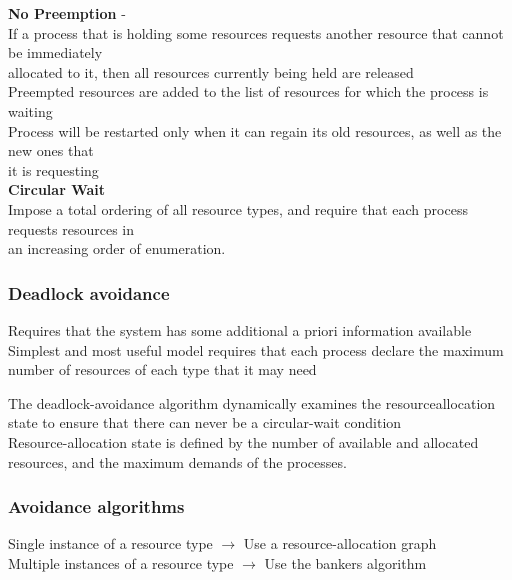 \documentclass[a4paper,10pt,titlepage]{report}
\begin{document}
\textbf{No Preemption} - \\
\hspace{10mm}If a process that is holding some resources requests another resource that
cannot be immediately \\
\hspace{10mm}allocated to it, then all resources currently being held
are released\\
\hspace{10mm}Preempted resources are added to the list of resources for which the process
is waiting\\

\hspace{10mm}Process will be restarted only when it can regain its old resources, as well as
the new ones that \\
\hspace{10mm}it is requesting\\

\textbf{Circular Wait} \\
\hspace{10mm}Impose a total ordering of all resource types, and require that each process
requests resources in \\
\hspace{10mm} an increasing order of enumeration.\\
\subsubsection{Deadlock avoidance}
Requires that the system has some additional a priori information available \\
Simplest and most useful model requires that each process declare the
maximum number of resources of each type that it may need
\\
\vspace{10mm}

The deadlock-avoidance algorithm dynamically examines the resourceallocation
state to ensure that there can never be a circular-wait condition
\\
Resource-allocation state is defined by the number of available and allocated
resources, and the maximum demands of the processes. \\

\subsubsection{Avoidance algorithms}
Single instance of a resource type $ \rightarrow $  Use a resource-allocation graph \\
Multiple instances of a resource type $ \rightarrow $ Use the bankers algorithm\\
\end{document}
